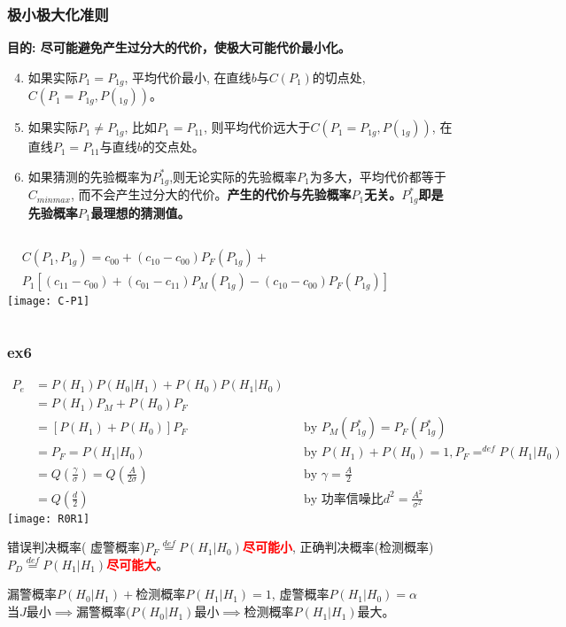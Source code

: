 \begin{frame}[shrink]
\frametitle{极小极大化准则}
\textbf{目的: 尽可能避免产生过分大的代价，使极大可能代价最小化。}
\begin{enumerate}
	\setcounter{enumi}{3}
	\item 如果实际$P_1=P_{1g}$, 平均代价最小, 在直线$b$与$C(P_1)$的切点处, $C(P_1=P_{1g},P(_{1g}))$。
	\item 如果实际$P_1\ne P_{1g}$, 比如$P_1=P_{11}$, 则平均代价远大于$C(P_1=P_{1g},P(_{1g}))$, 在直线$P_1=P_{11}$与直线$b$的交点处。
	\item 如果猜测的先验概率为$P_{1g}^{\ast}$,则无论实际的先验概率$P_1$为多大，平均代价都等于$C_{minmax}$, 而不会产生过分大的代价。\textbf{产生的代价与先验概率$P_1$无关。$P_{1g}^{\ast}$即是先验概率$P_1$最理想的猜测值。}
\end{enumerate}
\begin{columns}
	\begin{align*}
	&C(P_1,P_{1g})=c_{00}+(c_{10}-c_{00})P_F(P_{1g})+\\
	&P_1[(c_{11}-c_{00})+(c_{01}-c_{11})P_M(P_{1g})-(c_{10}-c_{00})P_F(P_{1g})]
	\end{align*}
	\texttt{[image: C-P1]}
\end{columns}
\end{frame}

\begin{frame}[shrink]
\frametitle{ex6}
\begin{align*}
    P_e&=P(H_1)P(H_0|H_1)+P(H_0)P(H_1|H_0)\\
    &=P(H_1)P_M+P(H_0)P_F\\
    &=[P(H_1)+P(H_0)]P_F &&\text{by }P_M(P_{1g}^\ast)=P_F(P_{1g}^\ast)\\
    &=P_F=P(H_1|H_0) &&\text{by }P(H_1)+P(H_0)=1, P_F\mathop{=}^{def}P(H_1|H_0)\\
    &=Q(\frac{\gamma}{\sigma})=Q\left(\frac{A}{2\sigma}\right) && \text{by }\gamma=\frac{A}{2}\\
    &=Q(\frac{d}{2}) &&\text{by 功率信噪比}d^2=\frac{A^2}{\sigma^2}
\end{align*}
\texttt{[image: R0R1]}
\end{frame}

\begin{frame}
错误判决概率( 虚警概率)$P_F\mathop{=}\limits^{def}P(H_1|H_0)$\textcolor{red}{\textbf{尽可能小}}, 正确判决概率(检测概率)$P_D\mathop{=}\limits^{def}P(H_1|H_1)$\textcolor{red}{\textbf{尽可能大}}。

\medskip 
漏警概率$P(H_0|H_1)+$检测概率$P(H_1|H_1)=1$, 虚警概率$P(H_1|H_0)=\alpha$\\
当$J$最小$\implies$漏警概率$(P(H_0|H_1)$最小$\implies$检测概率$P(H_1|H_1)$最大。

\end{frame}


